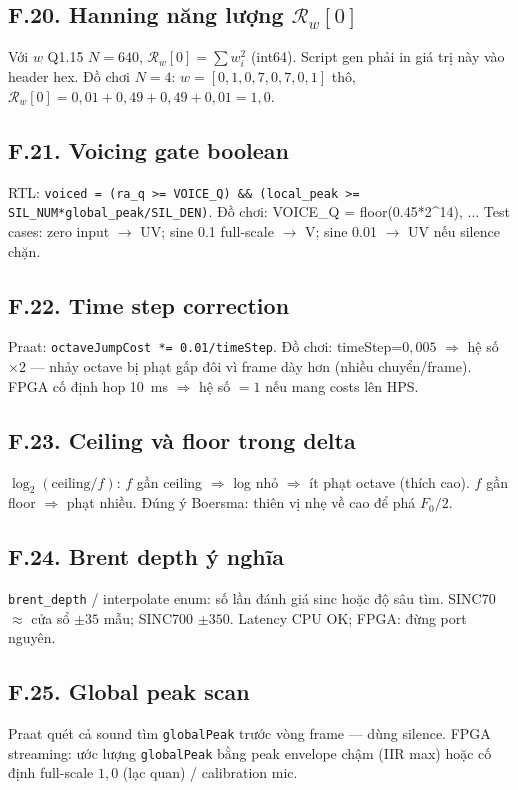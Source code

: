 \subsection*{F.20. Hanning năng lượng $\mathcal{R}_w[0]$}
Với $w$ Q1.15 $N=640$, $\mathcal{R}_w[0]=\sum w_i^2$ (int64). Script gen phải in giá trị này vào header hex. Đồ chơi $N=4$: $w=[0{,}1,0{,}7,0{,}7,0{,}1]$ thô, $\mathcal{R}_w[0]=0{,}01+0{,}49+0{,}49+0{,}01=1{,}0$.

\subsection*{F.21. Voicing gate boolean}
RTL: \texttt{voiced = (ra\_q >= VOICE\_Q) \&\& (local\_peak >= SIL\_NUM*global\_peak/SIL\_DEN)}. Đồ chơi: VOICE\_Q = floor(0.45*2^14), ... Test cases: zero input $\to$ UV; sine 0.1 full-scale $\to$ V; sine 0.01 $\to$ UV nếu silence chặn.

\subsection*{F.22. Time step correction}
Praat: \texttt{octaveJumpCost *= 0.01/timeStep}. Đồ chơi: timeStep=$0{,}005$ $\Rightarrow$ hệ số $\times2$ --- nhảy octave bị phạt gấp đôi vì frame dày hơn (nhiều chuyển/frame). FPGA cố định hop 10~ms $\Rightarrow$ hệ số $=1$ nếu mang costs lên HPS.

\subsection*{F.23. Ceiling và floor trong delta}
$\log_2(\mathrm{ceiling}/f)$: $f$ gần ceiling $\Rightarrow$ log nhỏ $\Rightarrow$ ít phạt octave (thích cao). $f$ gần floor $\Rightarrow$ phạt nhiều. Đúng ý Boersma: thiên vị nhẹ về cao để phá $F_0/2$.

\subsection*{F.24. Brent depth ý nghĩa}
\texttt{brent\_depth} / interpolate enum: số lần đánh giá sinc hoặc độ sâu tìm. SINC70 $\approx$ cửa sổ $\pm35$ mẫu; SINC700 $\pm350$. Latency CPU OK; FPGA: đừng port nguyên.

\subsection*{F.25. Global peak scan}
Praat quét cả sound tìm \texttt{globalPeak} trước vòng frame --- dùng silence. FPGA streaming: ước lượng \texttt{globalPeak} bằng peak envelope chậm (IIR max) hoặc cố định full-scale $1{,}0$ (lạc quan) / calibration mic.

